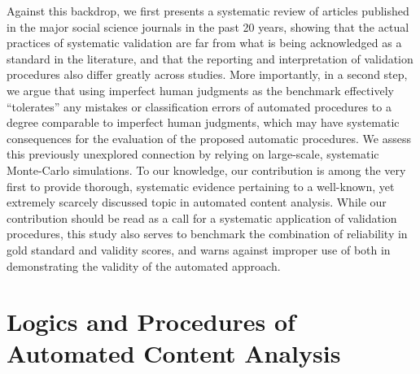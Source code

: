 \documentclass[man, floatsintext, 12pt, a4paper, noextraspace]{apa6}
\begin{document}
    Against this backdrop, we first presents a systematic review of articles published in the major social science journals in the past 20 years, showing that the actual practices of systematic validation are far from what is being acknowledged as a standard in the literature, and that the reporting and interpretation of validation procedures also differ greatly across studies. More importantly, in a second step, we argue that using imperfect human judgments as the benchmark effectively \enquote{tolerates} any mistakes or classification errors of automated procedures to a degree comparable to imperfect human judgments, which may have systematic consequences for the evaluation of the proposed automatic procedures. We assess this previously unexplored connection by relying on large-scale, systematic Monte-Carlo simulations. To our knowledge, our contribution is among the very first to provide thorough, systematic evidence pertaining to a well-known, yet extremely scarcely discussed topic in automated content analysis. While our contribution should be read as a call for a systematic application of validation procedures, this study also serves to benchmark the combination of reliability in gold standard and validity scores, and warns against improper use of both in demonstrating the validity of the automated approach. 
    
 \section{Logics and Procedures of Automated Content Analysis}
 
\end{document}
